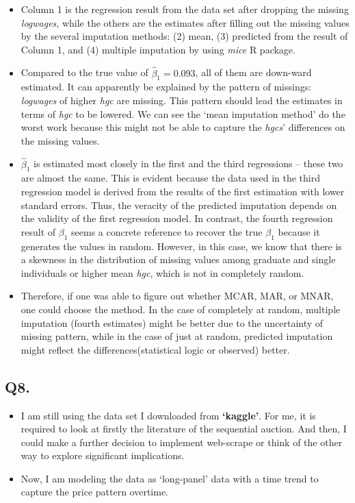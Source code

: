 \documentclass{article}
\begin{document}
\begin{itemize}
\begin{table}[h]
\begin{tabular}[t]{lcccc}
			\end{tabular}
		\end{table}
		\item Column 1 is the regression result from the data set after dropping the missing \textit{logwages}, while the others are the estimates after filling out the missing values by the several imputation methods: (2) mean, (3) predicted from the result of Column 1, and (4) multiple imputation by using \textit{mice} R package.
		\item Compared to the true value of $ \widehat{\beta}_{1} = 0.093 $, all of them are down-ward estimated. It can apparently be explained by the pattern of missings: \textit{logwages} of higher \textit{hgc} are missing. This pattern should lead the estimates in terms of \textit{hgc} to be lowered. We can see the `mean imputation method' do the worst work because this might not be able to capture the \textit{hgcs}' differences on the missing values.
		\item $ \widehat{\beta}_{1} $ is estimated most closely in the first and the third regressions -- these two are almost the same. This is evident because the data used in the third regression model is derived from the results of the first estimation with lower standard errors. Thus, the veracity of the predicted imputation depends on the validity of the first regression model. In contrast, the fourth regression result of  $ \beta_{1} $ seems a concrete reference to recover the true $ \beta_{1} $ because it generates the values in random. However, in this case, we know that there is a skewness in the distribution of missing values among graduate and single individuals or higher mean \textit{hgc}, which is not in completely random.
		\item Therefore, if one was able to figure out whether MCAR, MAR, or MNAR, one could choose the method. In the case of completely at random, multiple imputation (fourth estimates) might be better due to the uncertainty of missing pattern, while in the case of just at random, predicted imputation might reflect the differences(statistical logic or observed) better.
	\end{itemize}
	
\subsection*{Q8.}
\begin{itemize}
	\item I am still using the data set I downloaded from \textbf{`kaggle'}. For me, it is required to look at firstly the literature of the sequential auction. And then, I could make a further decision to implement web-scrape or think of the other way to explore significant implications.
	\item Now, I am modeling the data as `long-panel' data with a time trend to capture the price pattern overtime.
\end{itemize}

		
		
		
\end{document}

